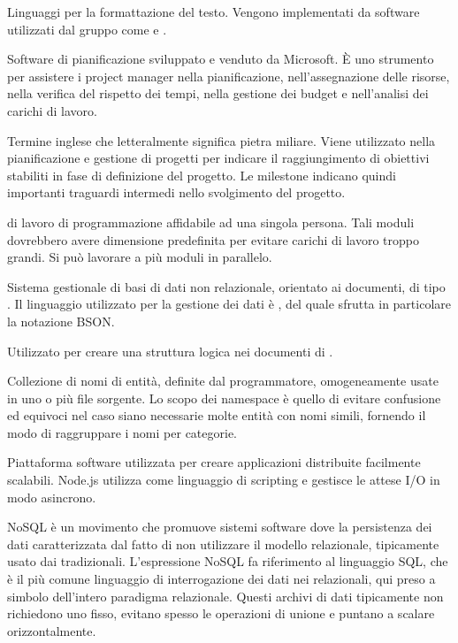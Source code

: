 Linguaggi per la formattazione del testo. Vengono implementati da software utilizzati dal gruppo come  e .

Software di pianificazione sviluppato e venduto da Microsoft. È  uno strumento per assistere i project manager nella pianificazione, nell'assegnazione delle risorse, nella verifica del rispetto dei tempi, nella gestione dei budget e nell'analisi dei carichi di lavoro.

Termine inglese che letteralmente significa pietra miliare. Viene utilizzato nella pianificazione e gestione di progetti per indicare il raggiungimento di obiettivi stabiliti in fase di definizione del progetto. 
Le milestone indicano quindi importanti traguardi intermedi nello svolgimento del progetto.

 di lavoro di programmazione affidabile ad una singola persona. Tali moduli dovrebbero avere dimensione predefinita per evitare carichi di lavoro troppo grandi. Si può lavorare a più moduli in parallelo.

Sistema gestionale di basi di dati non relazionale, orientato ai documenti, di tipo . Il linguaggio utilizzato per la gestione dei dati è , del quale sfrutta in particolare la notazione BSON.

Utilizzato per creare una struttura logica nei documenti di .


Collezione di nomi di entità, definite dal programmatore, omogeneamente usate in uno o più file sorgente.  Lo scopo dei namespace è quello di evitare confusione ed equivoci nel caso siano necessarie molte entità con nomi simili, fornendo il modo di raggruppare i nomi per categorie. 

Piattaforma software utilizzata per creare applicazioni distribuite facilmente scalabili.
Node.js utilizza  come linguaggio di scripting e gestisce le attese I/O in modo asincrono.

NoSQL è un movimento che promuove sistemi software dove la persistenza dei dati caratterizzata dal fatto di non utilizzare il modello relazionale, tipicamente usato dai  tradizionali. L'espressione NoSQL fa riferimento al linguaggio SQL, che è il più comune linguaggio di interrogazione dei dati nei  relazionali, qui preso a simbolo dell'intero paradigma relazionale.
Questi archivi di dati tipicamente non richiedono uno  fisso, evitano spesso le operazioni di unione e puntano a scalare orizzontalmente.


